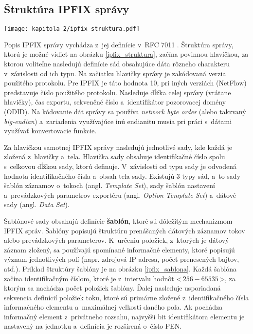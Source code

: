 \subsection*{Štruktúra IPFIX správy}

\begin{figure*}[ht]
    \centering
    \texttt{[image: kapitola\_2/ipfix\_struktura.pdf]}
    \caption{Štruktúra IPFIX správy}
    \label{ipfix_struktura}
\end{figure*}

Popis IPFIX správy vychádza z~jej definície v~RFC 7011 \cite{rfc7011}. Štruktúra správy, ktorú je možné vidieť na obrázku \ref{ipfix_struktura}, začína povinnou hlavičkou, za ktorou voliteľne nasledujú definície sád obsahujúce dáta rôzneho charakteru v~závislosti od ich typu.
Na začiatku hlavičky správy je zakódovaná verzia použitého protokolu.
Pre \mbox{IPFIX} je táto hodnota 10, pri iných verziách (NetFlow) predstavuje číslo použitého protokolu. Nasleduje dĺžka celej správy (vrátane hlavičky), čas exportu, sekvenčné číslo a~identifikátor pozorovacej domény (ODID). Na kódovanie dát správy sa používa
\textit{network byte order} (alebo takzvaný \textit{big-endian}) a~zariadenia využívajúce inú endianitu musia pri práci s~dátami využívať konvertovacie funkcie.

Za hlavičkou samotnej IPFIX správy nasledujú jednotlivé sady, kde každá je zložená z~hlavičky a~tela. Hlavička sady obsahuje identifikačné číslo spolu s~celkovou dĺžkou sady, ktorú definuje.
V~závislosti od typu sady je odvodená hodnota identifikačného čísla a~obsah tela sady. Existujú 3 typy sád, a~to sady šablón záznamov o~tokoch (angl. \textit{Template Set}), sady šablón nastavení a~prevádzkových parametrov exportéru
(angl. \textit{Option Template Set}) a~dátové sady (angl. \textit{Data Set}).

Šablónové sady obsahujú definície \textbf{šablón}, ktoré sú dôležitým mechanizmom IPFIX správ. Šablóny popisujú štruktúru prenášaných dátových záznamov tokov alebo prevádzkových parameterov. K~určeniu položiek, z~ktorých je dátový záznam zložený, sa používajú spomínané
informačné elementy, ktoré popisujú význam jednotlivých polí (napr. zdrojová IP adresa, počet prenesených bajtov, atď.). Príklad štruktúry šablóny je na obrázku \ref{ipfix_sablona}. Každá šablóna začína identifikačným číslom, ktoré je z~intervalu hodnôt <\,$256-65535$\,>,
za ktorým sa nachádza počet položiek šablóny. Ďalej nasleduje usporiadaná sekvencia definícií položiek toku, ktoré sú primárne zložené z~identifikačného čísla informačného elementu a~maximálnej veľkosti daného poľa. Ak pochádza informačný element z~privátneho rozsahu, najvyšší
bit identifikátora elementu je nastavený na jednotku a~definícia je rozšírená o~číslo PEN.

